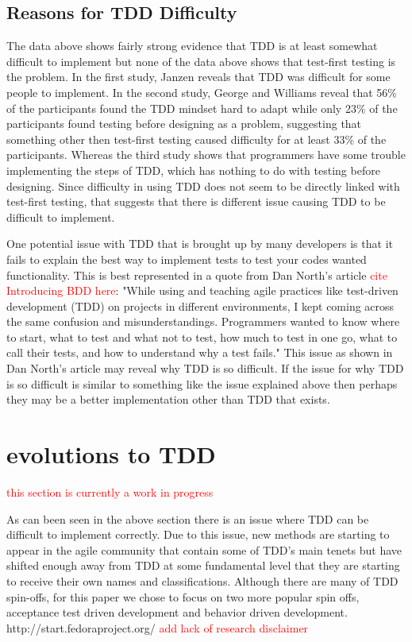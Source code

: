 \documentclass{sig-alternate}
\newcommand{\mycomment}[1]{\textcolor{red}{#1}}
\begin{document}
\subsection{Reasons for TDD Difficulty}
The data above shows fairly strong evidence that TDD is at least somewhat difficult to implement but none of the data above shows that test-first testing is the problem.  In the first study, Janzen reveals that TDD was difficult for some people to implement.  In the second study, George and Williams reveal that 56\% of the participants found the TDD mindset hard to adapt while only 23\% of the participants found testing before designing as a problem, suggesting that something other then test-first testing caused difficulty for at least 33\% of the participants.  Whereas the third study shows that programmers have some trouble implementing the steps of TDD, which has nothing to do with testing before designing.  Since difficulty in using TDD does not seem to be directly linked with test-first testing, that suggests that there is different issue causing TDD to be difficult to implement.

One potential issue with TDD that is brought up by many developers is that it fails to explain the best way to implement tests to test your codes wanted functionality.  This is best represented in a quote from Dan North's article \mycomment{cite Introducing BDD here}: "While using and teaching agile practices like test-driven development (TDD) on projects in different environments, I kept coming across the same confusion and misunderstandings. Programmers wanted to know where to start, what to test and what not to test, how much to test in one go, what to call their tests, and how to understand why a test fails."  This issue as shown in Dan North's article may reveal why TDD is so difficult.  If the issue for why TDD is so difficult is similar to something like the issue explained above then perhaps they may be a better implementation other than TDD that exists.  

\section{evolutions to TDD}
\mycomment{this section is currently a work in progress}

As can been seen in the above section there is an issue where TDD can be difficult to implement correctly.  Due to this issue, new methods are starting to appear in the agile community that contain some of TDD's main tenets but have shifted enough away from TDD at some fundamental level that they are starting to receive their own names and classifications.  Although there are many of TDD spin-offs, for this paper we chose to focus on two more popular spin offs, acceptance test driven development and behavior driven development.
http://start.fedoraproject.org/
\mycomment{add lack of research disclaimer}
\end{document}
